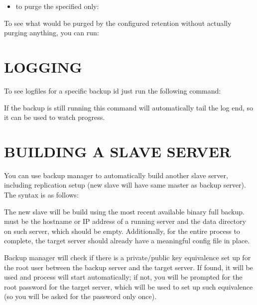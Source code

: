 \documentclass[letterpaper,10pt,english]{sphinxmanual}
\begin{document}
\begin{itemize}
\item {} 
to purge the specified  only:

\end{itemize}


To see what would be purged by the configured retention without actually purging
anything, you can run:



\section{LOGGING}
\label{\detokenize{mariadb-backup-manager:logging}}
To see logfiles for a specific backup id just run the following command:


If the backup is still running this command will automatically tail the log end, so it can
be used to watch progress.


\section{BUILDING A SLAVE SERVER}
\label{\detokenize{mariadb-backup-manager:building-a-slave-server}}
You can use backup manager to automatically build another slave server, including replication
setup (new slave will have same master as backup server).
The syntax is as follows:


The new slave will be build using the most recent available binary full backup.
 must be the hostname or IP address of a running server and 
the data directory on such server, which should be empty. Additionally, for the entire
process to complete, the target server should already have a meaningful config file in place.

Backup manager will check if there is a private/public key equivalence set up for the root
user between the backup server and the target server. If found, it will be used and process
will start automatically; if not, you will be prompted for the root password for the target
server, which will be used to set up such equivalence (so you will be asked for the password
only once).
\end{document}
